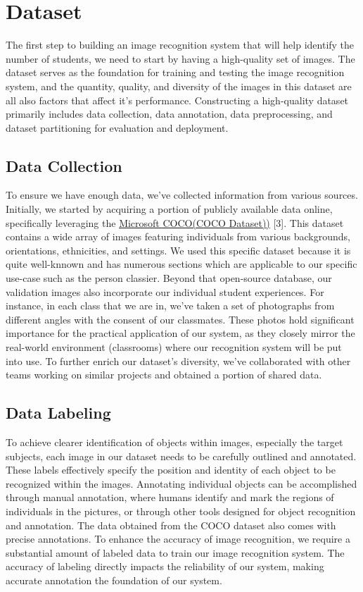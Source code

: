 \section{Dataset}
The first step to building an image recognition system that will help identify the number of students, we need to start by having a high-quality set of images. The dataset serves as the foundation for training and testing the image recognition system, and the quantity, quality, and diversity of the images in this dataset are all also factors that affect it's performance. Constructing a high-quality dataset primarily includes data collection, data annotation, data preprocessing, and dataset partitioning for evaluation and deployment.\\
\label{sec:method}
\subsection{Data Collection}
\label{subsec:method}
To ensure we have enough data, we've collected information from various sources. Initially, we started by acquiring a portion of publicly available data online, specifically leveraging the \href{https://cocodataset.org/#home}{\underline{Microsoft COCO(COCO Dataset))}} [3]. This dataset contains a wide array of images featuring individuals from various backgrounds, orientations, ethnicities, and settings. We used this specific dataset because it is quite well-knnown and has numerous sections which are applicable to our specific use-case such as the person classier. Beyond that open-source database, our validation images also incorporate our individual student experiences. For instance, in each class that we are in, we've taken a set of photographs from different angles with the consent of our classmates. These photos hold significant importance for the practical application of our system, as they closely mirror the real-world environment (classrooms) where our recognition system will be put into use. To further enrich our dataset's diversity, we've collaborated with other teams working on similar projects and obtained a portion of shared data.\\
\label{sec:method}
\subsection{Data Labeling}
\label{subsec:method}
To achieve clearer identification of objects within images, especially the target subjects, each image in our dataset needs to be carefully outlined and annotated. These labels effectively specify the position and identity of each object to be recognized within the images. Annotating individual objects can be accomplished through manual annotation, where humans identify and mark the regions of individuals in the pictures, or through other tools designed for object recognition and annotation. The data obtained from the COCO dataset also comes with precise annotations. To enhance the accuracy of image recognition, we require a substantial amount of labeled data to train our image recognition system. The accuracy of labeling directly impacts the reliability of our system, making accurate annotation the foundation of our system.\\
\label{sec:method}
